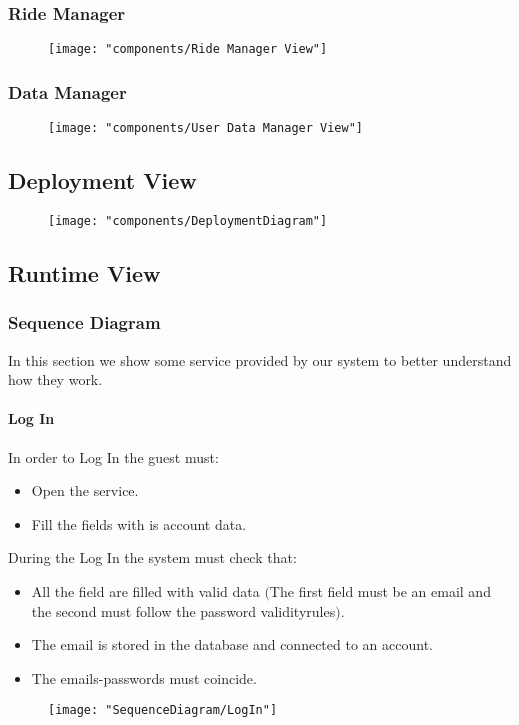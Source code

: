 	\subsubsection{Ride Manager}
		\begin{figure}[h!]
			\centering
			\texttt{[image: "components/Ride Manager View"]}
		\end{figure}

	\subsubsection{Data Manager}
		\begin{figure}[h!]
			\centering
			\texttt{[image: "components/User Data Manager View"]}
		\end{figure}



\subsection{Deployment View}
	\begin{figure}[h!]
			\centering
			\texttt{[image: "components/DeploymentDiagram"]}
	\end{figure}

\newpage

\subsection{Runtime View}
	\subsubsection{Sequence Diagram}
	In this section we show some service provided by our system to better understand how they work.
			\paragraph{Log In}
			In order to Log In the guest must: \begin{itemize}
				\item Open the service.
				\item Fill the fields with is account data.
			\end{itemize}
			During the Log In the system must check that:\begin{itemize}
				\item All the field are filled with valid data $($The first field must be an email and the second must follow the password validity\askpippo rules$)$.
				\item The email is stored in the database and connected to an account.
				\item The emails-passwords must coincide.
			\end{itemize}
			\newpage
			\begin{figure}[h!]
				\centering
				\texttt{[image: "SequenceDiagram/LogIn"]}
			\end{figure}
			\newpage

